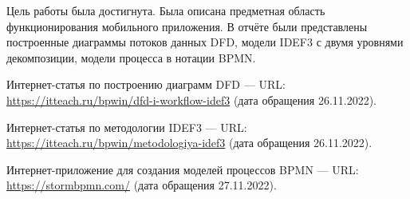 \documentclass[14pt]{extreport}
\begin{document}
Цель работы была достигнута. Была описана предметная область функционирования мобильного приложения. В отчёте были представлены построенные диаграммы потоков данных DFD, модели IDEF3 с двумя уровнями декомпозиции, модели процесса в нотации BPMN.

\newpage
\begin{thebibliography}{99}

Интернет-статья по построению диаграмм DFD — URL: \url{https://itteach.ru/bpwin/dfd-i-workflow-idef3} (дата обращения 26.11.2022).	

Интернет-статья по методологии IDEF3 — URL: \url{https://itteach.ru/bpwin/metodologiya-idef3} (дата обращения 26.11.2022).	

Интернет-приложение для создания моделей процессов BPMN — URL: \url{https://stormbpmn.com/} (дата обращения 27.11.2022).	
	
\end{thebibliography}
\end{document}
